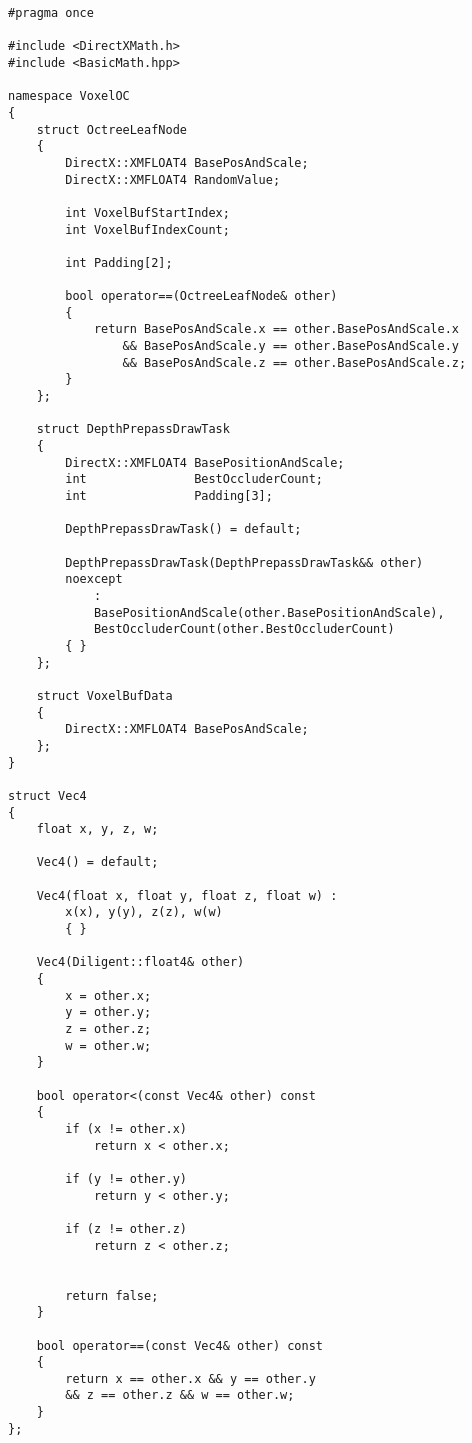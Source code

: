 \begin{lstlisting}
#pragma once

#include <DirectXMath.h>
#include <BasicMath.hpp>

namespace VoxelOC
{
    struct OctreeLeafNode
    {
        DirectX::XMFLOAT4 BasePosAndScale;
        DirectX::XMFLOAT4 RandomValue;

        int VoxelBufStartIndex;
        int VoxelBufIndexCount;

        int Padding[2];

        bool operator==(OctreeLeafNode& other)
        {
            return BasePosAndScale.x == other.BasePosAndScale.x
                && BasePosAndScale.y == other.BasePosAndScale.y
                && BasePosAndScale.z == other.BasePosAndScale.z;
        }
    };

    struct DepthPrepassDrawTask
    {
        DirectX::XMFLOAT4 BasePositionAndScale;
        int               BestOccluderCount;
        int               Padding[3];

        DepthPrepassDrawTask() = default;

        DepthPrepassDrawTask(DepthPrepassDrawTask&& other) 
        noexcept
            :
            BasePositionAndScale(other.BasePositionAndScale),
            BestOccluderCount(other.BestOccluderCount)
        { }
    };

    struct VoxelBufData
    {
        DirectX::XMFLOAT4 BasePosAndScale;
    };
}

struct Vec4
{
    float x, y, z, w;
    
    Vec4() = default;

    Vec4(float x, float y, float z, float w) : 
        x(x), y(y), z(z), w(w)
        { }

    Vec4(Diligent::float4& other)
    {
        x = other.x;
        y = other.y;
        z = other.z;
        w = other.w;
    }

    bool operator<(const Vec4& other) const
    {
        if (x != other.x)
            return x < other.x;

        if (y != other.y)
            return y < other.y;

        if (z != other.z)
            return z < other.z;


        return false;
    }

    bool operator==(const Vec4& other) const
    {
        return x == other.x && y == other.y 
        && z == other.z && w == other.w;
    }
};

\end{lstlisting}

